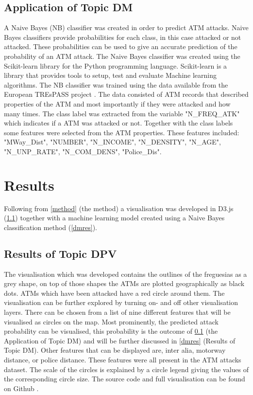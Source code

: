 \documentclass[conference]{IEEEtran}
\begin{document}
\subsection{Application of Topic DM} \label{dm}
A Naive Bayes (NB) classifier was created in order to predict ATM attacks. Naive Bayes classifiers provide probabilities for each class, in this case attacked or not attacked. These probabilities can be used to give an accurate prediction of the probability of an ATM attack.
The Naive Bayes classifier was created using the Scikit-learn library for the Python programming language. Scikit-learn is a library that provides tools to setup, test and evaluate Machine learning algorithms. 
The NB classifier was trained using the data available from the European TREsPASS project  \cite{c2}. The data consisted of ATM records that described properties of the ATM and most importantly if they were attacked and how many times. The class label was extracted from the variable "N\_FREQ\_ATK" which indicates if a ATM was attacked or not. Together with the class labels some features were selected from the ATM properties. These features included: "MWay_Dist", "NUMBER", "N_INCOME", "N_DENSITY", "N_AGE", "N_UNP_RATE", "N_COM_DENS", "Police_Dis". 


\section{Results} \label{results}
Following from \ref{method} (the method) a visualisation was developed in D3.js (\ref{dpvres}) together with a machine learning model created using a Naive Bayes classification method (\ref{dmres}).

\subsection{Results of Topic DPV} \label{dpvres}
The visualisation which was developed contains the outlines of the freguesias as a grey shape, on top of those shapes the ATMs are plotted geographically as black dots. ATMs which have been attacked have a red circle around them. The visualisation can be further explored by turning on- and off other visualisation layers. There can be chosen from a list of nine different features that will be visualised as circles on the map. Most prominently, the predicted attack probability can be visualised, this probability is the outcome of \ref{dm} (the Application of Topic DM) and will be further discussed in \ref{dmres} (Results of Topic DM). Other features that can be displayed are, inter alia, motorway distance, or police distance. These features were all present in the ATM attacks dataset. The scale of the circles is explained by a circle legend giving the values of the corresponding circle size. The source code and full visualisation can be found on Github \cite{c3}\cite{c6}.
\end{document}
